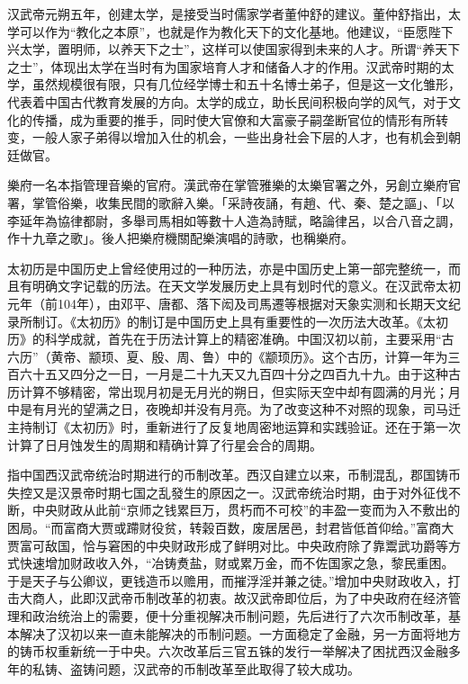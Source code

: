 汉武帝元朔五年，创建太学，是接受当时儒家学者董仲舒的建议。董仲舒指出，太学可以作为“教化之本原”，也就是作为教化天下的文化基地。他建议，“臣愿陛下兴太学，置明师，以养天下之士”，这样可以使国家得到未来的人才。所谓“养天下之士”，体现出太学在当时有为国家培育人才和储备人才的作用。汉武帝时期的太学，虽然规模很有限，只有几位经学博士和五十名博士弟子，但是这一文化雏形，代表着中国古代教育发展的方向。太学的成立，助长民间积极向学的风气，对于文化的传播，成为重要的推手，同时使大官僚和大富豪子嗣垄断官位的情形有所转变，一般人家子弟得以增加入仕的机会，一些出身社会下层的人才，也有机会到朝廷做官。

樂府一名本指管理音樂的官府。漢武帝在掌管雅樂的太樂官署之外，另創立樂府官署，掌管俗樂，收集民間的歌辭入樂。「采詩夜誦，有趙、代、秦、楚之謳」、「以李延年為協律都尉，多舉司馬相如等數十人造為詩賦，略論律呂，以合八音之調，作十九章之歌」。後人把樂府機關配樂演唱的詩歌，也稱樂府。

太初历是中国历史上曾经使用过的一种历法，亦是中国历史上第一部完整统一，而且有明确文字记载的历法。在天文学发展历史上具有划时代的意义。在汉武帝太初元年（前104年），由邓平、唐都、落下闳及司馬遷等根据对天象实测和长期天文纪录所制订。《太初历》的制订是中国历史上具有重要性的一次历法大改革。《太初历》的科学成就，首先在于历法计算上的精密准确。中国汉初以前，主要采用“古六历”（黄帝、颛顼、夏、殷、周、鲁）中的《颛顼历》。这个古历，计算一年为三百六十五又四分之一日，一月是二十九天又九百四十分之四百九十九。由于这种古历计算不够精密，常出现月初是无月光的朔日，但实际天空中却有圆满的月光；月中是有月光的望满之日，夜晚却并没有月亮。为了改变这种不对照的现象，司马迁主持制订《太初历》时，重新进行了反复地周密地运算和实践验证。还在于第一次计算了日月蚀发生的周期和精确计算了行星会合的周期。

指中国西汉武帝统治时期进行的币制改革。西汉自建立以来，币制混乱，郡国铸币失控又是汉景帝时期七国之乱發生的原因之一。汉武帝统治时期，由于对外征伐不断，中央财政从此前“京师之钱累巨万，贯朽而不可校”的丰盈一变而为入不敷出的困局。“而富商大贾或蹛财役贫，转榖百数，废居居邑，封君皆低首仰给。”富商大贾富可敌国，恰与窘困的中央财政形成了鲜明对比。中央政府除了靠鬻武功爵等方式快速增加财政收入外，“冶铸煑盐，财或累万金，而不佐国家之急，黎民重困。于是天子与公卿议，更钱造币以赡用，而摧浮淫并兼之徒。”增加中央财政收入，打击大商人，此即汉武帝币制改革的初衷。故汉武帝即位后，为了中央政府在经济管理和政治统治上的需要，便十分重视解决币制问题，先后进行了六次币制改革，基本解决了汉初以来一直未能解决的币制问题。一方面稳定了金融，另一方面将地方的铸币权重新统一于中央。六次改革后三官五铢的发行一举解决了困扰西汉金融多年的私铸、盗铸问题，汉武帝的币制改革至此取得了较大成功。

